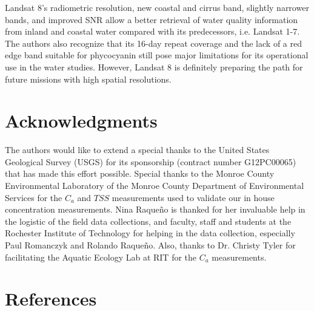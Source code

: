 \documentclass[onecolumn,3p,letterpaper,11pt]{elsarticle}
\begin{document}
Landsat 8's radiometric resolution, new coastal and cirrus band, slightly narrower bands, and improved SNR allow a better retrieval of water quality information from inland and coastal water compared with its predecessors, i.e. Landsat 1-7. The authors also recognize that its 16-day repeat coverage and the lack of a red edge band suitable for phycocyanin still pose major limitations for its operational use in the water studies. However, Landsat 8 is definitely preparing the path for future missions with high spatial resolutions.

\section*{Acknowledgments}
\vspace{-.2cm}
The authors would like to extend a special thanks to the United States Geological Survey (USGS) for its sponsorship (contract number G12PC00065) that has made this effort possible. Special thanks to the Monroe County Environmental Laboratory of the Monroe County Department of Environmental Services for the $C_a$ and $TSS$ measurements used to validate our in house concentration measurements. Nina Raque\~{n}o is thanked for her invaluable help in the logistic of the field data collections, and faculty, staff and students at the Rochester Institute of Technology for helping in the data collection, especially Paul Romanczyk and Rolando Raque\~{n}o. Also, thanks to Dr. Christy Tyler for facilitating the Aquatic Ecology Lab at RIT for the $C_a$ measurements.
\section*{References}


%

%






% 
% 



\end{document}

